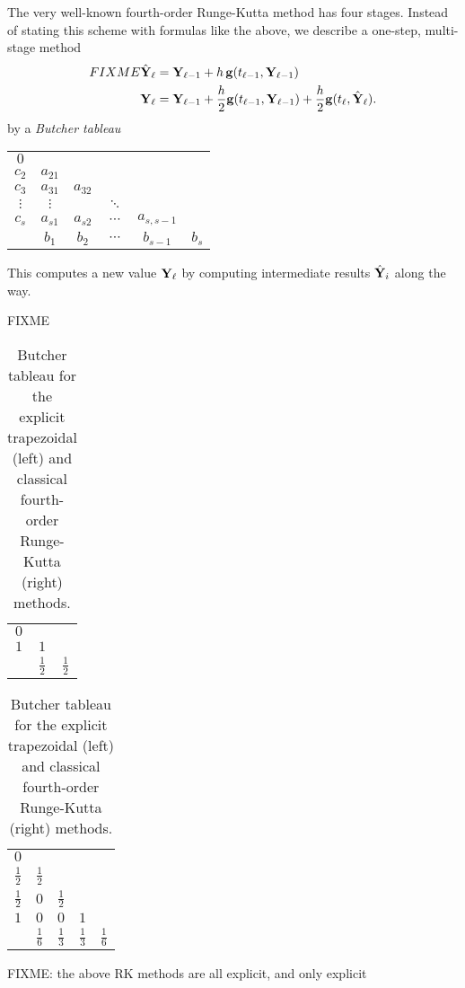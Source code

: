 The very well-known fourth-order Runge-Kutta method has four stages.  Instead of stating this scheme with formulas like the above, we describe a one-step, multi-stage method
\begin{align}
FIXME \hat{\mathbf{Y}}_\ell &= \mathbf{Y}_{\ell-1} + h\, \mathbf{g}(t_{\ell-1},\mathbf{Y}_{\ell-1}) \label{eq:ts:rkgeneral} \\
\mathbf{Y}_\ell &= \mathbf{Y}_{\ell-1} + \frac{h}{2} \mathbf{g}(t_{\ell-1},\mathbf{Y}_{\ell-1}) + \frac{h}{2} \mathbf{g}(t_\ell,\hat{\mathbf{Y}}_\ell). \notag
\end{align}
by a \emph{Butcher tableau} \citep{Butcher1987}
\begin{center}
\begin{tabular}{c|ccccc}
$0$ \\
$c_2$    & $a_{21}$\\
$c_3$    & $a_{31}$ & $a_{32}$\\
$\vdots$ & $\vdots$ &           & $\ddots$\\
$c_s$    & $a_{s1}$ & $a_{s2}$  & $\cdots$ & $a_{s,s - 1}$\\ \hline
         & $b_1$    & $b_2$     & $\cdots$ & $b_{s-1}$     & $b_s$
\end{tabular}
\end{center}
This computes a new value $\mathbf{Y}_\ell$ by computing intermediate results $\hat{\mathbf{Y}}_i$ along the way.

FIXME


\begin{table}
\begin{tabular}{c|cc}
$0$   \\
$1$ & $1$ \\ \hline
    & $\frac{1}{2}$ & $\frac{1}{2}$
\end{tabular}
\hfill
\begin{tabular}{c|cccc}
$0$   \\
$\frac{1}{2}$ & $\frac{1}{2}$ \\
$\frac{1}{2}$ & $0$           & $\frac{1}{2}$ \\
$1$           & $0$           & $0$           & $1$  \\ \hline
              & $\frac{1}{6}$ & $\frac{1}{3}$ & $\frac{1}{3}$ & $\frac{1}{6}$
\end{tabular}
\caption{Butcher tableau for the explicit trapezoidal (left) and classical fourth-order Runge-Kutta (right) methods.} \label{tab:ts:twotableau}
\end{table}


FIXME: the above RK methods are all explicit, and only explicit




